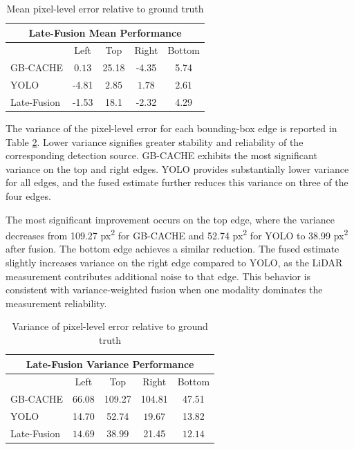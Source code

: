 \documentclass{erauthesis}
\begin{document}
\begin{table}[htpb]
\centering
\begin{tabular}{lcccc}
\hline
\multicolumn{5}{c}{Late-Fusion Mean Performance}\\
\hline
\hline
            & Left  & Top   & Right & Bottom \\
GB-CACHE    & $\mathbf{0.13}$  & 25.18 & -4.35 & 5.74   \\
YOLO        & -4.81 & $\mathbf{2.85}$  & $\mathbf{1.78}$  & $\mathbf{2.61}$   \\
Late-Fusion & -1.53 & 18.1  & -2.32 & 4.29  \\
\hline
\end{tabular}
\caption{Mean pixel-level error relative to ground truth}
\label{tab:fusion_mean_error}
\end{table}


The variance of the pixel-level error for each bounding-box edge is reported in Table \ref{tab:fusion_variance}. Lower variance signifies greater stability and reliability of the corresponding detection source. GB-CACHE exhibits the most significant variance on the top and right edges. YOLO provides substantially lower variance for all edges, and the fused estimate further reduces this variance on three of the four edges.

The most significant improvement occurs on the top edge, where the variance decreases from 109.27 px\textsuperscript{2} for GB-CACHE and 52.74 px\textsuperscript{2} for YOLO to 38.99 px\textsuperscript{2} after fusion. The bottom edge achieves a similar reduction. The fused estimate slightly increases variance on the right edge compared to YOLO, as the LiDAR measurement contributes additional noise to that edge. This behavior is consistent with variance-weighted fusion when one modality dominates the measurement reliability.


\begin{table}[htpb]
\centering
\begin{tabular}{lcccc}
\hline
\multicolumn{5}{c}{Late-Fusion Variance Performance}\\
\hline
\hline
            & Left  & Top   & Right & Bottom \\
GB-CACHE    & 66.08  & 109.27 & 104.81 & 47.51   \\
YOLO        & 14.70 & 52.74  & $\mathbf{19.67}$  & 13.82   \\
Late-Fusion & $\mathbf{14.69}$ & $\mathbf{38.99}$  & 21.45 & $\mathbf{12.14}$  \\
\hline
\end{tabular}
\caption{Variance of pixel-level error relative to ground truth}
\label{tab:fusion_variance}
\end{table}
\end{document}
